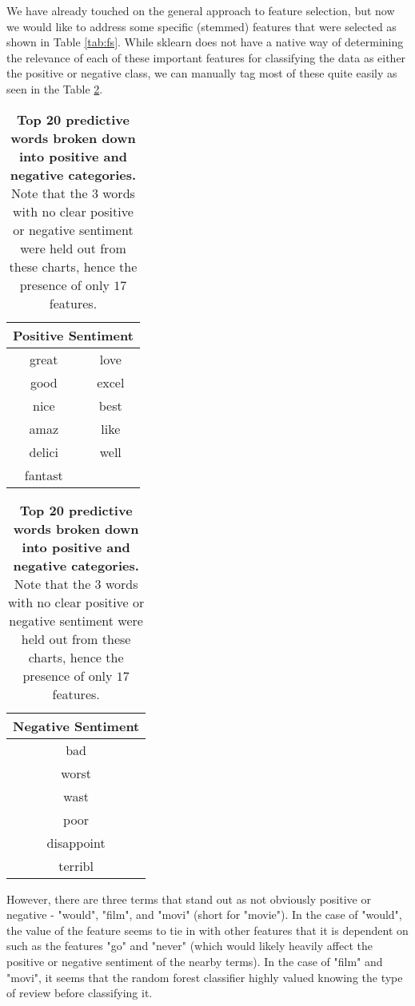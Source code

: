 \documentclass{article} %
\begin{document}
We have already touched on the general approach to feature selection, but now we would like to address some specific (stemmed) features that were selected as shown in Table \ref{tab:fs}. While sklearn does not have a native way of determining the relevance of each of these important features for classifying the data as either the positive or negative class, we can manually tag most of these quite easily as seen in the Table \ref{tab:sent}.

\begin{table}[htb]
\begin{center}
\begin{tabular}{|c|c|} 
 \hline
\multicolumn{2}{|c|}{Positive Sentiment} \\
\hline\hline
great	 & love \\
\hline
good	 & excel \\
\hline
nice & best \\
\hline
amaz & like \\
\hline
delici & well \\
\hline
fantast &  \\
\hline
\end{tabular}
\hspace{10mm}
\begin{tabular}{|c|} 
 \hline
\multicolumn{1}{|c|}{Negative Sentiment} \\
\hline\hline
bad \\
\hline
worst \\
\hline
wast \\
\hline
poor \\
\hline
disappoint \\
\hline
terribl  \\
\hline
\end{tabular}
\caption{\label{tab:sent}\textbf{Top 20 predictive words broken down into positive and negative categories.} Note that the 3 words with no clear positive or negative sentiment were held out from these charts, hence the presence of only $17$ features.}
\end{center}
\vspace*{-3mm}
\end{table}

However, there are three terms that stand out as not obviously positive or negative - "would", "film", and "movi" (short for "movie"). In the case of "would", the value of the feature seems to tie in with other features that it is dependent on such as the features "go" and "never" (which would likely heavily affect the positive or negative sentiment of the nearby terms). In the case of "film" and "movi", it seems that the random forest classifier highly valued knowing the type of review before classifying it.
\end{document}
